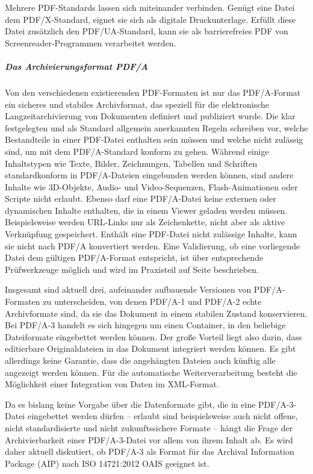 Mehrere PDF-Standards lassen sich miteinander verbinden. Genügt eine Datei dem PDF/X-Standard, eignet sie sich als digitale Druckunterlage. Erfüllt diese Datei zusätzlich den PDF/UA-Standard, kann sie als barrierefreies PDF von Screenreader-Programmen verarbeitet werden. 

\subparagraph{Das Archivierungsformat PDF/A}
Von den verschiedenen existierenden PDF-Formaten ist nur das PDF/A-Format ein sicheres und stabiles Archivformat, das speziell für die elektronische Langzeitarchivierung von Dokumenten definiert und publiziert wurde. Die klar festgelegten und als Standard allgemein anerkannten Regeln schreiben vor, welche Bestandteile in einer PDF-Datei enthalten sein müssen und welche nicht zulässig sind, um mit dem PDF/A-Standard konform zu gehen. Während einige Inhaltstypen wie Texte, Bilder, Zeichnungen, Tabellen und Schriften standardkonform in PDF/A-Dateien eingebunden werden können, sind andere Inhalte wie 3D-Objekte, Audio- und Video-Sequenzen, Flash-Animationen oder Scripte nicht erlaubt. Ebenso darf eine PDF/A-Datei keine externen oder dynamischen Inhalte enthalten, die in einem Viewer geladen werden müssen. Beispielsweise werden URL-Links nur als Zeichenkette, nicht aber als aktive Verknüpfung gespeichert. Enthält eine PDF-Datei nicht zulässige Inhalte, kann sie nicht nach PDF/A konvertiert werden. Eine Validierung, ob eine vorliegende Datei dem gültigen PDF/A-Format entspricht, ist über entsprechende Prüfwerkzeuge möglich und wird im Praxisteil auf Seite \pageref{pdf-validierung} beschrieben.

Insgesamt sind aktuell drei, aufeinander aufbauende Versionen von PDF/A-Formaten zu unterscheiden, von denen PDF/A-1 und PDF/A-2 echte Archivformate sind, da sie das Dokument in einem stabilen Zustand konservieren. Bei PDF/A-3 handelt es sich hingegen um einen Container, in den beliebige Dateiformate eingebettet werden können. Der große Vorteil liegt also darin, dass editierbare Originaldateien in das Dokument integriert werden können. Es gibt allerdings keine Garantie, dass die angehängten Dateien auch künftig alle angezeigt werden können. Für die automatische Weiterverarbeitung besteht die Möglichkeit einer Integration von Daten im XML-Format.

Da es bislang keine Vorgabe über die Datenformate gibt, die in eine PDF/A-3-Datei eingebettet werden dürfen -- erlaubt sind beispielsweise auch nicht offene, nicht standardisierte und nicht zukunftssichere Formate -- hängt die Frage der Archivierbarkeit einer PDF/A-3-Datei vor allem von ihrem Inhalt ab. Es wird daher aktuell diskutiert, ob PDF/A-3 als Format für das Archival Information Package (AIP) nach ISO 14721:2012 OAIS geeignet ist.

